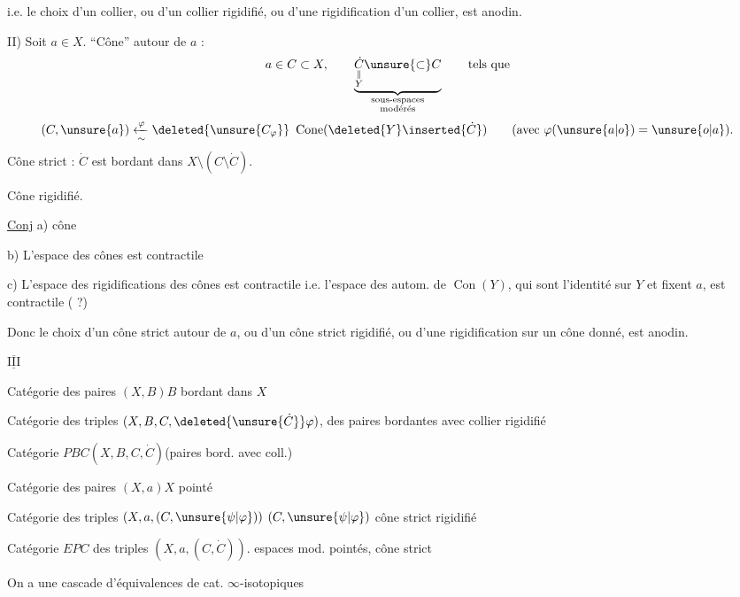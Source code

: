 i.e. le choix d'un collier, ou d'un collier  rigidifié,
ou d'une rigidification d'un collier, est
anodin.

II) Soit $a\in X$. ``Cône'' autour de $a$ :
\[
a\in C\subset X,\qquad
\underbrace{\underset{\substack{\Vert\\Y}}{\dot C}\unsure{\subset}C}_{\substack{\text{sous-espaces}\\\text{modérés}}}
\qquad\text{tels que}
\]
\[
(C,\unsure{a})\xleftarrow[\sim]{\varphi}
\deleted{\unsure{C_\varphi}}\ \operatorname{Cone}(\deleted{Y}\inserted{\dot C})
\qquad(\text{avec }\varphi(\unsure{a|o})=\unsure{o|a}).
\]
Cône strict : $\dot C$ est bordant dans $X\setminus(C\setminus\dot C)$.

Cône rigidifié.

\uline{Conj} a)  cône

b) L'espace des cônes  est contractile

c) L'espace des rigidifications des
cônes est contractile i.e. l'espace
des autom. de $\operatorname{Con}(Y)$, qui sont
l'identité sur $Y$ et fixent $a$,
est contractile ( ?)

Donc le choix d'un cône strict autour
de $a$, ou d'un cône strict rigidifié,
ou d'une  rigidification sur un
cône donné, est anodin.

$\overline{\underline{\mathrm{III}}}$

Catégorie  des paires $(X,B)$\quad $B$ bordant dans $X$

Catégorie  des  triples
$(X,B,C,\deleted{\unsure{\dot C}}\varphi)$, des
paires bordantes avec collier  rigidifié

Catégorie $PBC$\quad $(X,B,C,\dot C)$\quad (paires bord. avec coll.)

Catégorie  des paires $(X,a)$\quad $X$ pointé

Catégorie  des triples $(X,a,(C,\unsure{\psi|\varphi}))$
$(C,\unsure{\psi|\varphi})$ cône strict rigidifié

Catégorie $EPC$ des triples $(X,a,(C,\dot C))$.
espaces mod. pointés,  cône strict

On a une cascade d'équivalences de cat.
 $\infty$-isotopiques

